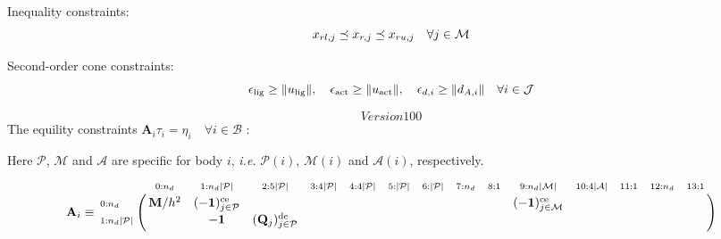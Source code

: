 \documentclass[a4paper,10pt]{article}
\begin{document}
\begin{landscape}
\noindent Inequality constraints:
\begin{equation}\notag
x_{rl,j} \preceq x_{r,j} \preceq x_{ru,j} \quad \forall j\in \mathcal{M}
\end{equation}

\noindent Second-order cone constraints:
\begin{equation}\notag
\epsilon_\text{lig} \geq \| u_\text{lig} \|, \quad \epsilon_\text{act} \geq \| u_\text{act} \|, \quad
\epsilon_{d,i} \geq \| d_{A,i} \| \quad \forall i \in \mathcal{J}
\end{equation}

\[Version 100\]
\noindent The equility constraints $\mathbf{A}_i \tau_i = \eta_i \quad \forall i \in \mathcal{B}$ :

Here $\mathcal{P}$, $\mathcal{M}$ and $\mathcal{A}$ are specific for body $i$,
\emph{i.e.} $\mathcal{P}(i)$, $\mathcal{M}(i)$ and $\mathcal{A}(i)$, respectively.
\begin{equation}\notag
\mathbf{A}_i \equiv
\bordermatrix{
                                    &    \scriptstyle{0 : n_d}                      &              \scriptstyle{1 : n_d |\mathcal{P}|}          &        \scriptstyle{2 : 5 |\mathcal{P}|}       &  \scriptstyle{3 : 4 |\mathcal{P}|}   & \scriptstyle{4 : 4|\mathcal{P}|}    &   \scriptstyle{5 : |\mathcal{P}| }  & \scriptstyle{6 : |\mathcal{P}| }  & \scriptstyle{7 : n_d}  &   \scriptstyle{8 : 1 } & \scriptstyle{9 : n_d |\mathcal{M}| }             & \scriptstyle{10: 4 |\mathcal{A}| }    &  \scriptstyle{11:1}        & \scriptstyle{12:n_d}   & \scriptstyle{13:1}  \cr
\scriptstyle{0:n_d}                 &  \mathbf{M}/h^2                               & (-\mathbf{1})_{j \in \mathcal{P}}^\text{ce}               &                                                &                                      &                                     &                                     &                                   &                        &                        & (-\mathbf{1})_{j \in \mathcal{M}}^\text{ce}      &                                       &                                       &                        &                      \cr
\scriptstyle{1:n_d |\mathcal{P}|}   &                                               &  -\mathbf{1}                                              &  (\mathbf{Q}_j)_{j \in \mathcal{P}}^\text{de}  &                                      &                                     &                                     &                                   &                        &                        &                                                  &                                       &                                 &                        &                       \cr
}
\end{equation}
\end{landscape}
\end{document}
